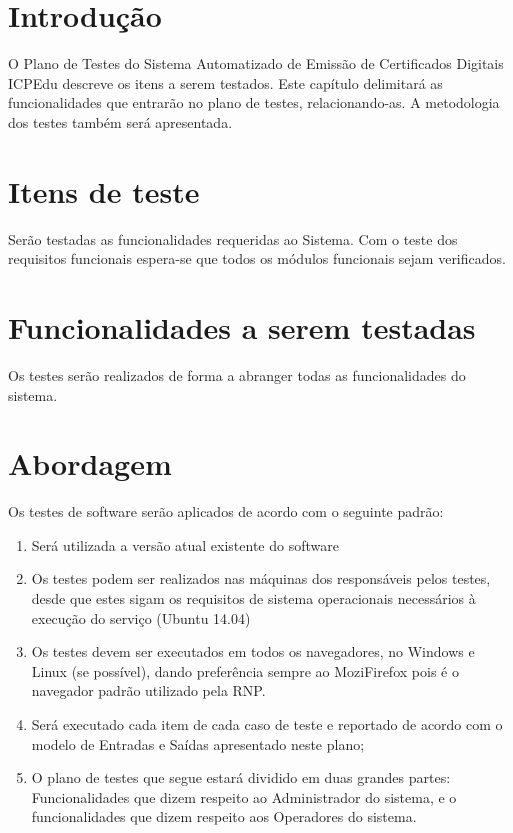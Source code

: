\section{Introdução}

O Plano de Testes do Sistema Automatizado de Emissão de Certificados Digitais ICPEdu descreve os itens a serem testados. Este capítulo delimitará as funcionalidades que entrarão no plano de testes, relacionando-as. A metodologia dos testes também será apresentada.

\section{Itens de teste}

Serão testadas as funcionalidades requeridas ao Sistema. Com o teste dos requisitos funcionais espera-se que todos os módulos funcionais sejam verificados.

\section{Funcionalidades a serem testadas}

Os testes serão realizados de forma a abranger todas as funcionalidades do sistema.

\section{Abordagem}

Os testes de software serão aplicados de acordo com o seguinte padrão:

\begin{enumerate}
 \item Será utilizada a versão atual existente do software
 \item Os testes podem ser realizados nas máquinas dos responsáveis pelos testes, desde que estes sigam os requisitos de sistema operacionais necessários à execução do serviço (Ubuntu 14.04)
 \item Os testes devem ser executados em todos os navegadores, no Windows e Linux (se possível), dando preferência sempre ao MoziFirefox pois é o navegador padrão utilizado pela RNP.
 \item Será executado cada item de cada caso de teste e reportado de acordo com o modelo de Entradas e Saídas apresentado neste plano;
 \item O plano de testes que segue estará dividido em duas grandes partes: Funcionalidades que dizem respeito ao Administrador do sistema, e o funcionalidades que dizem respeito aos Operadores do sistema.
\end{enumerate}

